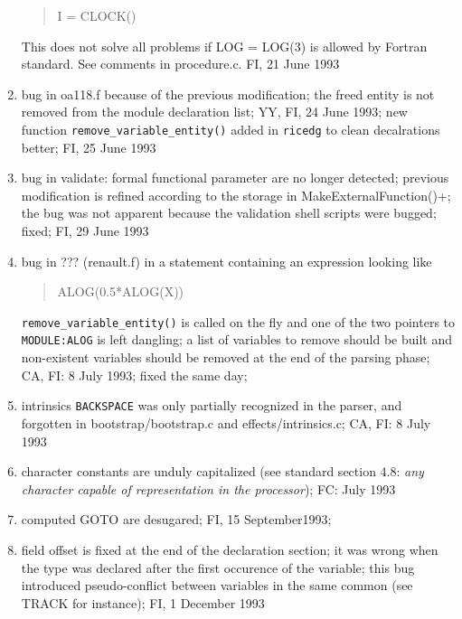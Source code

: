 \begin{enumerate}
\begin{quote}
I = CLOCK()
\end{quote}
        This does not solve all problems if LOG = LOG(3) is allowed
        by Fortran standard. See comments in procedure.c.
        FI, 21 June 1993

  \item bug in oa118.f because of the previous modification; the freed
        entity is not removed from the module declaration list; YY, FI,
        24 June 1993; new function \verb+remove_variable_entity()+
        added in \verb+ricedg+ to clean decalrations better; FI, 25 June
        1993

  \item bug in validate: formal functional parameter are no longer
        detected; previous modification is refined according to the
        storage in MakeExternalFunction()+; the bug was not apparent
        because the validation shell scripts were bugged; fixed; FI, 29
        June 1993

  \item bug in ??? (renault.f) in a statement containing an expression looking like
\begin{quote}
ALOG(0.5*ALOG(X))
\end{quote}
        \verb+remove_variable_entity()+ is called on the fly and one of
        the two pointers to \verb+MODULE:ALOG+ is left dangling; a list
        of variables to remove should be built and non-existent
        variables should be removed at the end of the parsing phase;
        CA, FI: 8 July 1993; fixed the same day;

  \item intrinsics \verb+BACKSPACE+ was only partially recognized in the
        parser, and forgotten in bootstrap/bootstrap.c and
        effects/intrinsics.c; CA, FI: 8 July 1993
        
  \item character constants are unduly capitalized (see standard section
        4.8: {\em any character capable of representation in the processor});
        FC: July 1993

  \item computed GOTO are desugared; FI, 15 September1993;

  \item field offset is fixed at the end of the declaration section; it
        was wrong when the type was declared after the first occurence
        of the variable; this bug introduced pseudo-conflict between
        variables in the same common (see TRACK for instance); FI, 1 December 1993


\end{enumerate}

